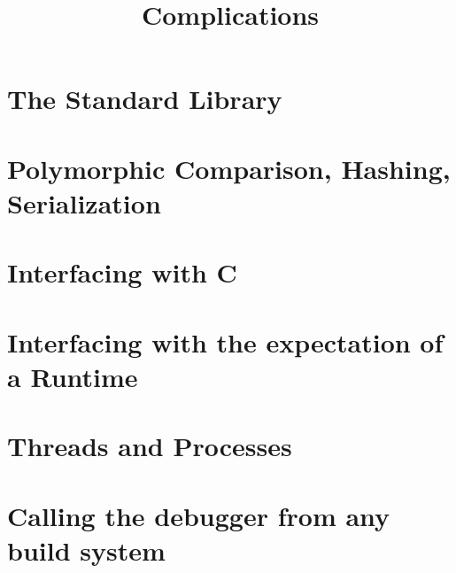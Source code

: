 \documentclass[10pt]{article}
\begin{document}
\title{Complications}
\maketitle

\section*{The Standard Library}

\section*{Polymorphic Comparison, Hashing, Serialization}

\section*{Interfacing with C}

\section*{Interfacing with the expectation of a Runtime}

\section*{Threads and Processes}

\section*{Calling the debugger from any build system}
\end{document}
